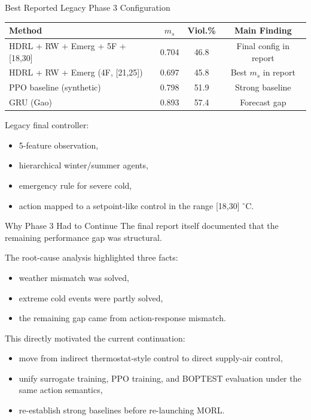 \documentclass[aspectratio=169,11pt]{beamer}
\newcommand{\degc}{\ensuremath{^\circ\mathrm{C}}}
\begin{document}
\begin{frame}{Best Reported Legacy Phase 3 Configuration}
  \small
  \begin{tabular}{lccc}
    \toprule
    Method & $m_s$ & Viol.\% & Main Finding \\
    \midrule
    HDRL + RW + Emerg + 5F + [18,30] & 0.704 & 46.8 & Final config in report \\
    HDRL + RW + Emerg (4F, [21,25]) & 0.697 & 45.8 & Best $m_s$ in report \\
    PPO baseline (synthetic) & 0.798 & 51.9 & Strong baseline \\
    GRU (Gao) & 0.893 & 57.4 & Forecast gap \\
    \bottomrule
  \end{tabular}

  \vspace{0.75em}
  Legacy final controller:
  \begin{itemize}
    \item 5-feature observation,
    \item hierarchical winter/summer agents,
    \item emergency rule for severe cold,
    \item action mapped to a setpoint-like control in the range [18,30] \degc{}.
  \end{itemize}
\end{frame}

\begin{frame}{Why Phase 3 Had to Continue}
  The final report itself documented that the remaining performance gap was structural.

  \vspace{0.5em}
  The root-cause analysis highlighted three facts:
  \begin{itemize}
    \item weather mismatch was solved,
    \item extreme cold events were partly solved,
    \item the remaining gap came from action-response mismatch.
  \end{itemize}

  \vspace{0.5em}
  This directly motivated the current continuation:
  \begin{itemize}
    \item move from indirect thermostat-style control to direct supply-air control,
    \item unify surrogate training, PPO training, and BOPTEST evaluation under the same action semantics,
    \item re-establish strong baselines before re-launching MORL.
  \end{itemize}
\end{frame}
\end{document}

